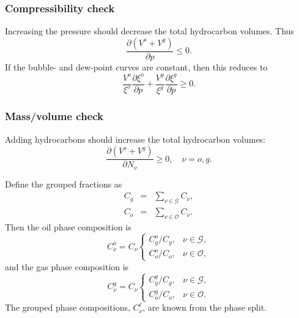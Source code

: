 
\subsubsection{Compressibility check}

Increasing the pressure should decrease the total hydrocarbon
volumes. Thus
\begin{equation}
  \frac{\partial\left(V^o + V^g\right)}{\partial p} \leq 0.
\end{equation}
If the bubble- and dew-point curves are constant, then this reduces to
\begin{equation}
  \frac{V^o}{\xi^o} \frac{\partial\xi^o}{\partial p} +
  \frac{V^g}{\xi^g} \frac{\partial\xi^g}{\partial p} \geq 0.
\end{equation}


\subsubsection{Mass/volume check}

Adding hydrocarbons should increase the total hydrocarbon volumes:
\begin{equation}
  \frac{\partial\left(V^o + V^g\right)}{\partial N_\nu} \geq 0,
  \quad\nu=o,g.
\end{equation}



Define the grouped fractions as
\begin{eqnarray}
  C_g & = & \sum_{\nu\in\mathcal{G}} C_\nu, \\
  C_o & = & \sum_{\nu\in\mathcal{O}} C_\nu.
\end{eqnarray}
Then the oil phase composition is
\begin{equation}
  C_\nu^o = C_\nu \left\{
    \begin{array}{ll}
      C_g^o / C_g, & \nu\in\mathcal{G}, \\
      C_o^o / C_o, & \nu\in\mathcal{O},
    \end{array}
  \right.
\end{equation}
and the gas phase composition is
\begin{equation}
  C_\nu^g = C_\nu \left\{
    \begin{array}{ll}
      C_g^g / C_g, & \nu\in\mathcal{G}, \\
      C_o^g / C_o, & \nu\in\mathcal{O}.
    \end{array}
  \right.
\end{equation}
The grouped phase compositions, $C_\nu^\ell$, are known from the phase
split.

